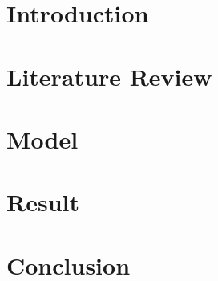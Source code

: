 \documentclass{ntuthesis}
\def\withwatermark{1}
\begin{document}
\frontmatter

\makecover

\ifdefined\excludefirstpage

  \def\withwatermark{1}
  \ifdefined\withwatermark
    \newsavebox\mybox
    \savebox{}
    \newwatermark*[allpages,xpos=6.1725cm,ypos=10.5225cm,scale=0.5]{\usebox\mybox}
  \fi

  \ifdefined\withdoi
    \insertdoi
  \fi
\fi


% 
% 


\mainmatter


\chapter{Introduction}
  \label{ch:intro}
\chapter{Literature Review} \label{ch:lit}
\chapter{Model} \label{ch:model}

\chapter{Result}  \label{ch:result}
\chapter{Conclusion} \label{ch:conclusion}



\backmatter
{}
{}




%   
\end{document}
